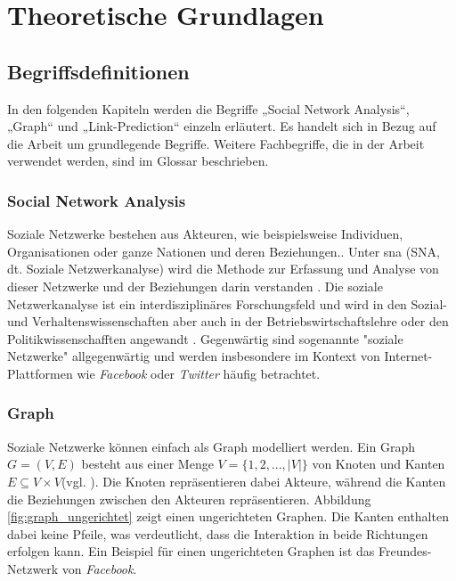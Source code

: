 \chapter{Theoretische Grundlagen}

\section{Begriffsdefinitionen}
In den folgenden Kapiteln werden die Begriffe „Social Network Analysis“, „Graph“ und „Link-Prediction“ einzeln
erläutert. Es handelt sich in Bezug auf die Arbeit um grundlegende Begriffe. Weitere Fachbegriffe, die
in der Arbeit verwendet werden, sind im Glossar beschrieben.

\subsection{Social Network Analysis}
Soziale Netzwerke bestehen aus Akteuren, wie beispielsweise Individuen, Organisationen oder ganze Nationen und deren Beziehungen.\cite{ulrike_baumol_soziale_nodate}.
Unter \acl{sna} (SNA, dt. Soziale Netzwerkanalyse) wird die Methode zur Erfassung und Analyse von dieser Netzwerke und der Beziehungen darin verstanden \cite{noauthor_soziale_2019}.
Die soziale Netzwerkanalyse ist ein interdisziplinäres Forschungsfeld und wird in den Sozial- und Verhaltenswissenschaften aber auch in der Betriebswirtschaftslehre oder den Politikwissenschafften angewandt \cite{ulrike_baumol_soziale_nodate}.
Gegenwärtig sind sogenannte "soziale Netzwerke" allgegenwärtig und werden insbesondere im Kontext von Internet-Plattformen wie \textit{Facebook} oder \textit{Twitter} häufig betrachtet.

\subsection{Graph}
Soziale Netzwerke können einfach als Graph modelliert werden.
Ein Graph $G = (V, E)$ besteht aus einer Menge $V = \{1,2,...,|V|\}$ von Knoten und Kanten $E \subseteq V\times V $(vgl. \cite{ottmann_algorithmen_2017}).
Die Knoten repräsentieren dabei Akteure, während die Kanten die Beziehungen zwischen den Akteuren repräsentieren.
Abbildung \ref{fig:graph_ungerichtet} zeigt einen ungerichteten Graphen. Die Kanten enthalten dabei keine Pfeile, was verdeutlicht, dass die Interaktion in beide Richtungen erfolgen kann.
Ein Beispiel für einen ungerichteten Graphen ist das Freundes-Netzwerk von \textit{Facebook}.

